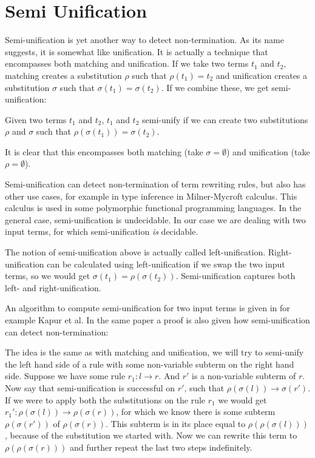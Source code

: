 \chapter{Semi Unification}\label{semi-unification}
Semi-unification is yet another way to detect non-termination. As its name suggests, it is somewhat like unification. It is actually a technique that encompasses both matching and unification. If we take two terms $t_1$ and $t_2$, matching creates a substitution $\rho$ such that $\rho(t_1) = t_2$ and unification creates a substitution $\sigma$ such that $\sigma(t_1) = \sigma(t_2)$. If we combine these, we get semi-unification:

\begin{definition}
Given two terms $t_1$ and $t_2$, $t_1$ and $t_2$ semi-unify if we can create two substitutions $\rho$ and $\sigma$ such that $\rho(\sigma(t_1)) = \sigma(t_2)$.
\end{definition}

It is clear that this encompasses both matching (take $\sigma = \emptyset$) and unification (take $\rho = \emptyset$). 

Semi-unification can detect non-termination of term rewriting rules, but also has other use cases, for example in type inference in Milner-Mycroft calculus\cite{Henglein:1988}. This calculus is used in some polymorphic functional programming languages. In the general case, semi-unification is undecidable\cite{KFOURY:1993}. In our case we are dealing with two input terms, for which semi-unification \textit{is} decidable.

The notion of semi-unification above is actually called left-unification. Right-unification can be calculated using left-unification if we swap the two input terms, so we would get $\sigma(t_1) = \rho(\sigma(t_2))$. Semi-unification captures both left- and right-unification.

An algorithm to compute semi-unification for two input terms is given in for example Kapur et al\cite{SemiUnification}. In the same paper a proof is also given how semi-unification can detect non-termination:

The idea is the same as with matching and unification, we will try to semi-unify the left hand side of a rule with some non-variable subterm on the right hand side. Suppose we have some rule $r_1: l \rightarrow r$. And $r'$ is a non-variable subterm of $r$. Now say that semi-unification is successful on $r'$, such that $\rho(\sigma(l)) \rightarrow \sigma(r')$. If we were to apply both the substitutions on the rule $r_1$ we would get $r_1': \rho(\sigma(l)) \rightarrow \rho(\sigma(r))$, for which we know there is some subterm $\rho(\sigma(r'))$ of $\rho(\sigma(r))$. This subterm is in its place equal to $\rho(\rho(\sigma(l)))$, because of the substitution we started with. Now we can rewrite this term to $\rho(\rho(\sigma(r)))$ and further repeat the last two steps indefinitely.


